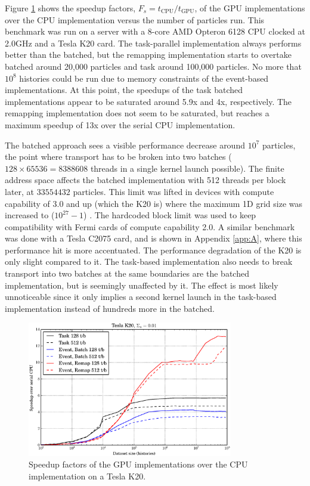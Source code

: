 Figure \ref{prelim_speedup_01} shows the speedup factors, $F_s=t_\mathrm{CPU}/t_\mathrm{GPU}$, of the GPU implementations over the CPU implementation versus the number of particles run.  This benchmark was run on a server with a 8-core AMD Opteron 6128 CPU clocked at 2.0GHz and a Tesla K20 card.  The task-parallel implementation always performs better than the batched, but the remapping implementation starts to overtake batched around 20,000 particles and task around 100,000 particles.  No more that $10^8$ histories could be run due to memory constraints of the event-based implementations.  At this point, the speedups of the task batched implementations appear to be saturated around 5.9x and 4x, respectively.  The remapping implementation does not seem to be saturated, but reaches a maximum speedup of 13x over the serial CPU implementation.  

The batched approach sees a visible performance decrease around $10^7$ particles, the point where transport has to be broken into two batches ($128\times65536=8388608$ threads in a single kernel launch possible).  The finite address space affects the batched implementation with 512 threads per block later, at $33554432$ particles.  This limit was lifted in devices with compute capability of 3.0 and up (which the K20 is) where the maximum 1D grid size was increased to ($10^{27}-1$) \cite{cuda}.  The hardcoded block limit was used to keep compatibility with Fermi cards of compute capability 2.0.  A similar benchmark was done with a Tesla C2075 card, and is shown in Appendix \ref{app:A}, where this performance hit is more accentuated.  The performance degradation of the K20 is only slight compared to it.   The task-based implementation also needs to break transport into two batches at the same boundaries are the batched implementation, but is seemingly unaffected by it.  The effect is most likely unnoticeable since it only implies a second kernel launch in the task-based implementation instead of hundreds more in the batched.

\begin{figure}[h!] 
  \centering
    \includegraphics[width=0.8\textwidth]{graphics/prelim_speedup_001_k20.eps}
     \caption{Speedup factors of the GPU implementations over the CPU implementation on a Tesla K20. \label{prelim_speedup_01} }
\end{figure}

